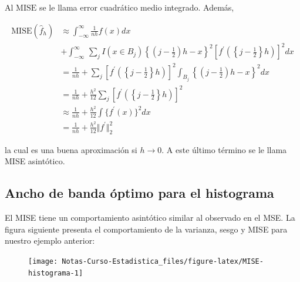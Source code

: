 \documentclass[
  12pt,
]{book}
\theoremstyle{definition}
\theoremstyle{definition}
\theoremstyle{definition}
\theoremstyle{definition}
\theoremstyle{remark}
\begin{document}
Al \(\mathrm{MISE}\) se le llama error cuadrático medio integrado. Además,

\begin{align*}
\mathrm{MISE} (\hat{f}_h)
& \approx \int_{ -\infty}^{\infty} \frac{1}{nh} f(x)dx                                                                                                                                          \\
& + \int_{ -\infty}^{\infty}\, \sum_{j}^{} I(x\in B_j) \left\{ \left( j- \frac{1}{2} \right)h -x  \right\}^2 \left [f^\prime \left( \left\{j - \frac{1}{2}\right\}h \right)  \right]^2 dx \\
& = \frac{1}{nh} + \sum_{j}^{} \left [f^\prime \left( \left\{j - \frac{1}{2}\right\}h \right)  \right]^2 \int_{ B_j}    \left\{ \left( j- \frac{1}{2} \right)h -x  \right\}^2 dx          \\
& =\frac{1}{nh} + \frac{h^2}{12} \sum_{j} \left [f^\prime \left( \left\{j - \frac{1}{2}\right\}h \right)  \right]^2                                                                       \\
& \approx \frac{1}{nh} + \frac{h^2}{12} \int \{f^\prime(x)\}^2 dx                                                                                                                         \\
& =\frac{1}{nh} + \frac{h^2}{12} \Vert f^\prime\Vert_{2}^2
\end{align*}

la cual es una buena aproximación si \(h\rightarrow 0\). A este último término se le llama MISE asintótico.

\hypertarget{ancho-de-banda-uxf3ptimo-para-el-histograma}{%
\subsection{Ancho de banda óptimo para el histograma}\label{ancho-de-banda-uxf3ptimo-para-el-histograma}}

El MISE tiene un comportamiento asintótico similar al observado en el MSE. La figura siguiente presenta el comportamiento de la varianza, sesgo y MISE para nuestro ejemplo anterior:

\begin{figure}

{\centering \texttt{[image: Notas-Curso-Estadistica\_files/figure-latex/MISE-histograma-1]} 

}

\caption{ }\label{fig:MISE-histograma}
\end{figure}
\end{document}
